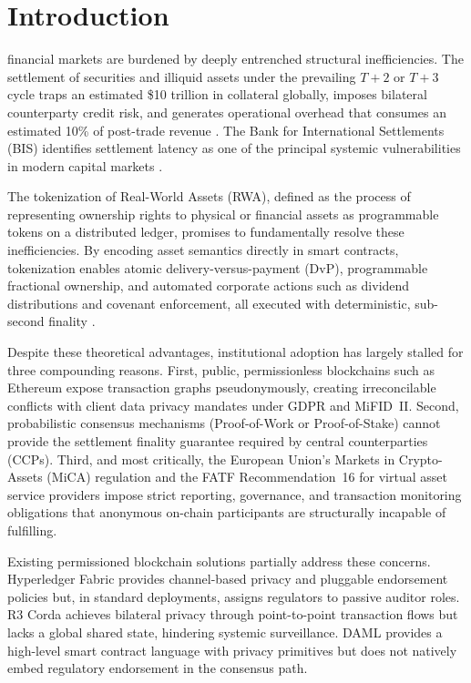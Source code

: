 \documentclass[journal,10pt,twocolumn]{IEEEtran}
\begin{document}
\section{Introduction}
\label{sec:intro}

 financial markets are burdened by deeply entrenched structural inefficiencies. The settlement of securities and illiquid assets under the prevailing $T+2$ or $T+3$ cycle traps an estimated \$10 trillion in collateral globally, imposes bilateral counterparty credit risk, and generates operational overhead that consumes an estimated 10\% of post-trade revenue \cite{ref:rwa_fsb, ref:ecb_dlt}. The Bank for International Settlements (BIS) identifies settlement latency as one of the principal systemic vulnerabilities in modern capital markets \cite{ref:bis_tokenisation}.

The tokenization of Real-World Assets (RWA), defined as the process of representing ownership rights to physical or financial assets as programmable tokens on a distributed ledger, promises to fundamentally resolve these inefficiencies. By encoding asset semantics directly in smart contracts, tokenization enables atomic delivery-versus-payment (DvP), programmable fractional ownership, and automated corporate actions such as dividend distributions and covenant enforcement, all executed with deterministic, sub-second finality \cite{ref:setl2023}.

Despite these theoretical advantages, institutional adoption has largely stalled for three compounding reasons. First, public, permissionless blockchains such as Ethereum expose transaction graphs pseudonymously, creating irreconcilable conflicts with client data privacy mandates under GDPR and MiFID~II. Second, probabilistic consensus mechanisms (Proof-of-Work or Proof-of-Stake) cannot provide the settlement finality guarantee required by central counterparties (CCPs). Third, and most critically, the European Union's Markets in Crypto-Assets (MiCA) regulation \cite{ref:mica} and the FATF Recommendation~16 for virtual asset service providers \cite{ref:fatf} impose strict reporting, governance, and transaction monitoring obligations that anonymous on-chain participants are structurally incapable of fulfilling.

Existing permissioned blockchain solutions partially address these concerns. Hyperledger Fabric \cite{ref:fabric} provides channel-based privacy and pluggable endorsement policies but, in standard deployments, assigns regulators to passive auditor roles. R3 Corda \cite{ref:corda} achieves bilateral privacy through point-to-point transaction flows but lacks a global shared state, hindering systemic surveillance. DAML \cite{ref:daml} provides a high-level smart contract language with privacy primitives but does not natively embed regulatory endorsement in the consensus path.
\end{document}

